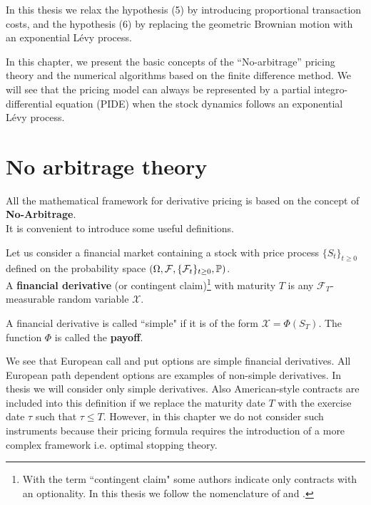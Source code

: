 In this thesis we relax the hypothesis (5) by introducing proportional transaction costs, and the hypothesis (6) by replacing the geometric Brownian motion
with an exponential Lévy process.

In this chapter, we present the basic concepts of the ``No-arbitrage'' pricing theory and the numerical algorithms based on the finite difference method. 
We will see that the pricing model can always be represented by a partial integro-differential equation 
(PIDE) when the stock dynamics follows an exponential Lévy process. 


\section{No arbitrage theory}\label{No_arbitrage_theory}

All the mathematical framework for derivative pricing is based on the concept of \textbf{No-Arbitrage}.\\
It is convenient to introduce some useful definitions.
\begin{Definition}
 Let us consider a financial market containing a stock with price process $\{S_t\}_{t\geq0}$ defined on the probability space 
 $(\Omega,\mathcal{F},\{\mathcal{F}_{t}\}_{t\geq0},\mathbb{P})$. \\
 A \textbf{financial derivative} (or contingent claim)\footnote{ 
 With the term ``contingent claim" some authors indicate only contracts with an optionality. In this thesis we follow the nomenclature of \cite{Bjork} and \cite{Musiela}.} 
 with maturity $T$
 is any $\mathcal{F}_{T}$-measurable random variable $\mathcal{X}$.
 
 A financial derivative is called ``simple" if it is of the form $\mathcal{X} = \Phi(S_{T})$. The function $\Phi$ is called the \textbf{payoff}.  
\end{Definition}
We see that European call and put options are simple financial derivatives. 
All European path dependent options are examples of non-simple derivatives. In thesis we will consider only simple derivatives. 
Also American-style contracts are included into this definition if we replace 
the maturity date $T$ with the exercise date $\tau$ such that $\tau \leq T$. 
However, in this chapter we do not consider such instruments because their pricing formula requires the introduction of a more complex framework i.e.
optimal stopping theory.

